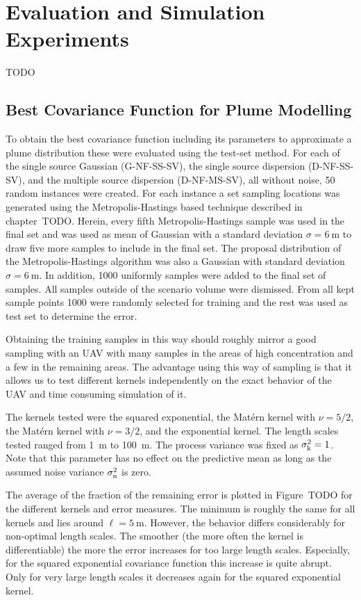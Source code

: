 \chapter{Evaluation and Simulation Experiments}\label{sec:exp}
TODO

\section{Best Covariance Function for Plume Modelling}
To obtain the best covariance function including its parameters to approximate 
a plume distribution these were evaluated using the test-set method. For each of 
the single source Gaussian (G-NF-SS-SV), the single source dispersion 
(D-NF-SS-SV), and the multiple source dispersion (D-NF-MS-SV), all without 
noise, 50 random instances were created. For each instance a set sampling 
locations was generated using the Metropolis-Hastings based technique described 
in chapter~TODO\@. Herein, every fifth Metropolis-Hastings sample was used in 
the final set and was used as mean of Gaussian with a standard deviation $\sigma 
= \SI{6}{\meter}$ to draw five more samples to include in the final set.  The 
proposal distribution of the Metropolis-Hastings algorithm was also a Gaussian 
with standard deviation $\sigma = \SI{6}{\meter}$. In addition, 1000 uniformly 
samples were added to the final set of samples. All samples outside of the 
scenario volume were dismissed. From all kept sample points 1000 were randomly 
selected for training and the rest was used as test set to determine the error.

Obtaining the training samples in this way should roughly mirror a good sampling 
with an UAV with many samples in the areas of high concentration and a few in 
the remaining areas. The advantage using this way of sampling is that it allows 
us to test different kernels independently on the exact behavior of the UAV and 
time consuming simulation of it.

The kernels tested were the squared exponential, the Mat\'ern kernel with $\nu 
= 5/2$, the Mat\'ern kernel with $\nu = 3/2$, and the exponential kernel. The 
length scales tested ranged from \SI{1}{\meter} to \SI{100}{\meter}. The process 
variance was fixed as $\sigma_{\mathrm{k}}^2 = 1$. Note that this parameter has no 
effect on the predictive mean as long as the assumed noise variance 
$\sigma_{\mathrm{n}}^2$ is zero.

The average of the fraction of the remaining error is plotted in Figure~TODO for 
the different kernels and error measures. The minimum is roughly the same for 
all kernels and lies around $\ell = \SI{5}{\meter}$.  However, the behavior 
differs considerably for non-optimal length scales. The smoother (the more often 
the kernel is differentiable) the more the error increases for too large 
length scales. Especially, for the squared exponential covariance function this 
increase is quite abrupt. Only for very large length scales it decreases again 
for the squared exponential kernel.

